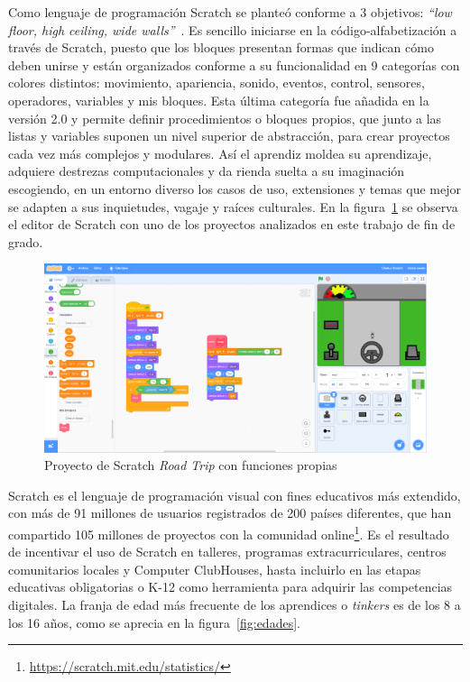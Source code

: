 \documentclass[a4paper, 12pt]{book}
\begin{document}
Como lenguaje de programación Scratch se planteó conforme a 3 objetivos: \emph{``low floor, high ceiling, wide walls''}~\cite{resnick2009scratch}. Es sencillo iniciarse en la código-alfabetización a través de Scratch, puesto que los bloques presentan formas que indican cómo deben unirse y están organizados conforme a su funcionalidad en 9 categorías con colores distintos: movimiento, apariencia, sonido, eventos, control, sensores, operadores, variables y mis bloques. Esta última categoría fue añadida en la versión 2.0 y permite definir procedimientos o bloques propios, que junto a las listas y variables suponen un nivel superior de abstracción, para crear proyectos cada vez más complejos y modulares. Así el aprendiz moldea su aprendizaje, adquiere destrezas computacionales y da rienda suelta a su imaginación escogiendo, en un entorno diverso los casos de uso, extensiones y temas que mejor se adapten a sus inquietudes, vagaje y raíces culturales. En la figura~\ref{fig:road_trip} se observa el editor de Scratch con uno de los proyectos analizados en este trabajo de fin de grado. 

\begin{figure}
    \centering
    \includegraphics[width=.8\textwidth]{img/proy_Scratch}
    \caption{Proyecto de Scratch \emph{Road Trip} con funciones propias}\label{fig:road_trip}
\end{figure}
 
Scratch es el lenguaje de programación visual con fines educativos más extendido, con más de 91 millones de usuarios registrados de 200 países diferentes, que han compartido 105 millones de proyectos con la comunidad online\footnote{\url{https://scratch.mit.edu/statistics/}}. Es el resultado de incentivar el uso de Scratch en talleres, programas extracurriculares, centros comunitarios locales y Computer ClubHouses, hasta incluirlo en las etapas educativas obligatorias o K-12 como herramienta para adquirir las competencias digitales. La franja de edad más frecuente de los aprendices o \emph{tinkers} es de los 8 a los 16 años, como se aprecia en la figura~\ref{fig:edades}. %
\end{document}
